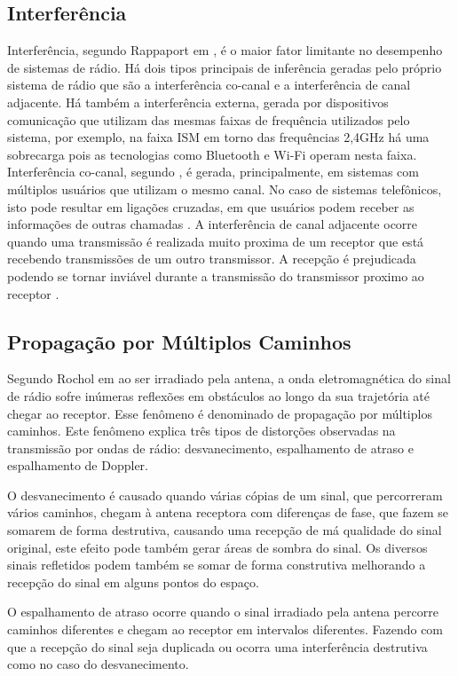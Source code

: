 \subsection*{Interferência}
Interferência, segundo Rappaport em \cite{rappaport2009}, é o maior fator limitante no desempenho de sistemas de rádio. Há dois tipos principais de inferência geradas pelo próprio sistema de rádio que são a interferência co-canal e a interferência de canal adjacente. Há também a interferência externa, gerada por dispositivos comunicação que utilizam das mesmas faixas de frequência utilizados pelo sistema, por exemplo, na faixa ISM em torno das frequências 2,4GHz há uma sobrecarga pois as tecnologias como Bluetooth e Wi-Fi operam nesta faixa. Interferência co-canal, segundo \cite{rochol2018sistemas}, é gerada, principalmente, em sistemas com múltiplos usuários que utilizam o mesmo canal. No caso de sistemas telefônicos, isto pode resultar em ligações cruzadas, em que usuários podem receber as informações de outras chamadas \cite{rappaport2009}. A interferência de canal adjacente ocorre quando uma transmissão é realizada muito proxima de um receptor que está recebendo transmissões de um outro transmissor. A recepção é prejudicada podendo se tornar inviável durante a transmissão do transmissor proximo ao receptor \cite{rappaport2009}.


\subsection*{Propagação por Múltiplos Caminhos}
Segundo Rochol em \cite{rochol2018sistemas} ao ser irradiado pela antena, a onda eletromagnética do sinal de rádio sofre inúmeras reflexões em obstáculos ao longo da sua trajetória até chegar ao receptor. Esse fenômeno é denominado de propagação por múltiplos caminhos. Este fenômeno explica três tipos de distorções observadas na transmissão por ondas de rádio: desvanecimento, espalhamento de atraso e espalhamento de Doppler.

O desvanecimento é causado quando várias cópias de um sinal, que percorreram vários caminhos, chegam à antena receptora com diferenças de fase, que fazem se somarem de forma destrutiva, causando uma recepção de má qualidade do sinal original, este efeito pode também gerar áreas de sombra do sinal. Os diversos sinais refletidos podem também se somar de forma construtiva melhorando a recepção do sinal em alguns pontos do espaço.

O espalhamento de atraso ocorre quando o sinal irradiado pela antena percorre caminhos diferentes e chegam ao receptor em intervalos diferentes. Fazendo com que a recepção do sinal seja duplicada ou ocorra uma interferência destrutiva como no caso do desvanecimento.

